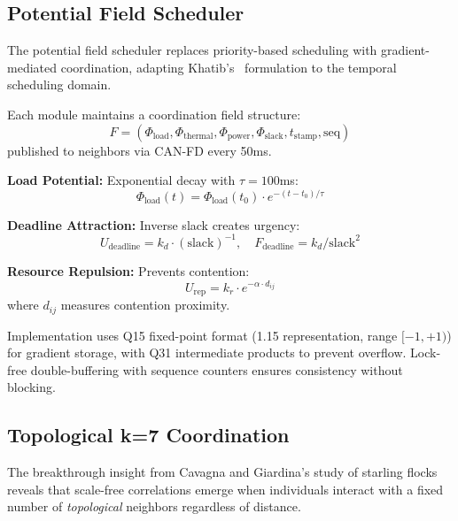 \subsection{Potential Field Scheduler}

The potential field scheduler replaces priority-based scheduling with gradient-mediated coordination, adapting Khatib's~\cite{khatib1986potential} formulation to the temporal scheduling domain.

\begin{definition}
Each module maintains a coordination field structure:
\begin{equation}
F = (\Phi_{\text{load}}, \Phi_{\text{thermal}}, \Phi_{\text{power}}, \Phi_{\text{slack}}, t_{\text{stamp}}, \text{seq})
\end{equation}
published to neighbors via CAN-FD every 50ms.
\end{definition}

\textbf{Load Potential:} Exponential decay with $\tau = 100$ms:
\begin{equation}
\Phi_{\text{load}}(t) = \Phi_{\text{load}}(t_0) \cdot e^{-(t-t_0)/\tau}
\end{equation}

\textbf{Deadline Attraction:} Inverse slack creates urgency:
\begin{equation}
U_{\text{deadline}} = k_d \cdot (\text{slack})^{-1}, \quad F_{\text{deadline}} = k_d / \text{slack}^2
\end{equation}

\textbf{Resource Repulsion:} Prevents contention:
\begin{equation}
U_{\text{rep}} = k_r \cdot e^{-\alpha \cdot d_{ij}}
\end{equation}
where $d_{ij}$ measures contention proximity.

Implementation uses Q15 fixed-point format (1.15 representation, range $[-1, +1)$) for gradient storage, with Q31 intermediate products to prevent overflow. Lock-free double-buffering with sequence counters ensures consistency without blocking.

\subsection{Topological k=7 Coordination}

The breakthrough insight from Cavagna and Giardina's study of starling flocks~\cite{cavagna2010scale} reveals that scale-free correlations emerge when individuals interact with a fixed number of \emph{topological} neighbors regardless of distance.

